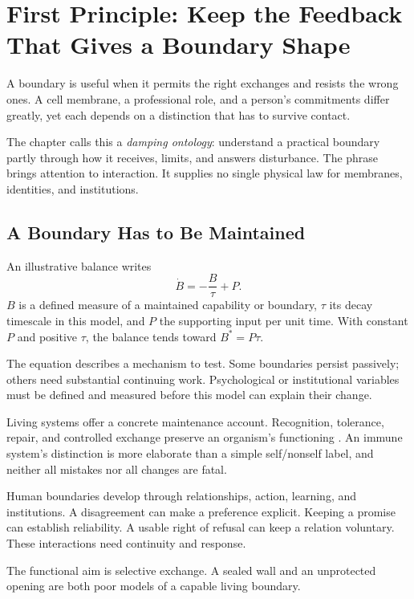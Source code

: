 \section{First Principle: Keep the Feedback That Gives a Boundary Shape}

A boundary is useful when it permits the right exchanges and resists the wrong ones. A cell membrane, a professional role, and a person's commitments differ greatly, yet each depends on a distinction that has to survive contact.

The chapter calls this a \emph{damping ontology}: understand a practical boundary partly through how it receives, limits, and answers disturbance. The phrase brings attention to interaction. It supplies no single physical law for membranes, identities, and institutions.

\subsection{A Boundary Has to Be Maintained}

An illustrative balance writes
\begin{equation}
 \dot B=-\frac{B}{\tau}+P.
\end{equation}
$B$ is a defined measure of a maintained capability or boundary, $\tau$ its decay timescale in this model, and $P$ the supporting input per unit time. With constant $P$ and positive $\tau$, the balance tends toward $B^\ast=P\tau$.

The equation describes a mechanism to test. Some boundaries persist passively; others need substantial continuing work. Psychological or institutional variables must be defined and measured before this model can explain their change.

Living systems offer a concrete maintenance account. Recognition, tolerance, repair, and controlled exchange preserve an organism's functioning \cite{burnet1959clonal}. An immune system's distinction is more elaborate than a simple self/nonself label, and neither all mistakes nor all changes are fatal.

Human boundaries develop through relationships, action, learning, and institutions. A disagreement can make a preference explicit. Keeping a promise can establish reliability. A usable right of refusal can keep a relation voluntary. These interactions need continuity and response.

The functional aim is selective exchange. A sealed wall and an unprotected opening are both poor models of a capable living boundary.

